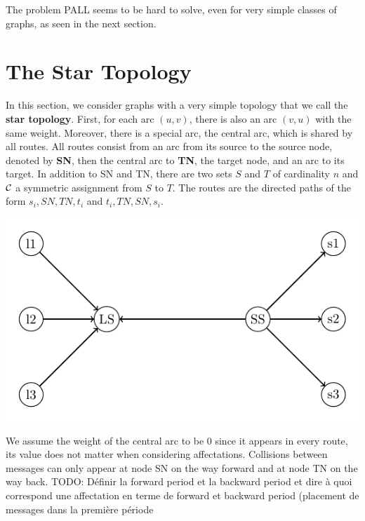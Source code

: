 \documentclass[a4paper,10pt]{article}
\newcommand{\todo}[1]{{\color{red} TODO: {#1}}}
\begin{document}
    
    The problem PALL seems to be hard to solve, even for very simple classes of graphs, as seen in the next section.
    
\section{The Star Topology}
  
   
    
      In this section, we consider graphs with a very simple topology that we call the {\bf star topology}. 
      First, for each arc $(u,v)$, there is also an arc $(v,u)$ with the same weight.
      Moreover, there is a special arc, the central arc, which is shared by all routes.
      All routes consist from an arc from its source to the source node, denoted by {\bf SN},
      then the central arc to {\bf TN}, the target node, and an arc to its target. In addition to SN and TN,
      there are two sets $S$ and $T$ of cardinality $n$ and ${\cal C}$ a symmetric assignment from $S$ to $T$. 
      The routes are the directed paths of the form $s_i,SN,TN,t_i$ and $t_i,TN,SN,s_i$. 
      
      
       \begin{center}
	  \includegraphics[scale=0.8]{Fig4.pdf}
	\end{center}
	
      We assume the weight of the central arc to be $0$ since it appears in every route,
      its value does not matter when considering affectations. Collisions between messages can 
      only appear at node SN on the way forward and at node TN on the way back. 
  \todo{Définir la forward period et la backward period et dire à quoi correspond une affectation en terme de forward et backward period (placement de messages dans la première période}     
\end{document}
